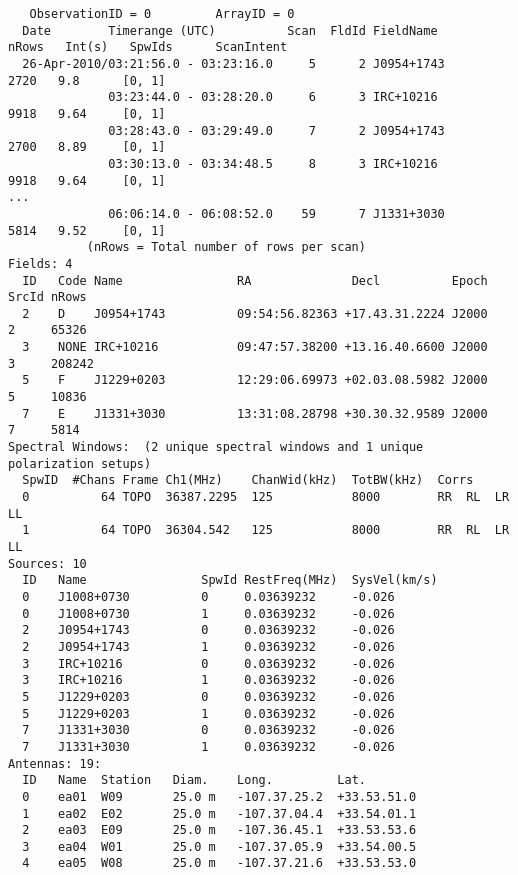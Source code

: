 \begin{verbatim}
   ObservationID = 0         ArrayID = 0
  Date        Timerange (UTC)          Scan  FldId FieldName           nRows   Int(s)   SpwIds      ScanIntent
  26-Apr-2010/03:21:56.0 - 03:23:16.0     5      2 J0954+1743          2720   9.8      [0, 1]                      
              03:23:44.0 - 03:28:20.0     6      3 IRC+10216           9918   9.64     [0, 1]                      
              03:28:43.0 - 03:29:49.0     7      2 J0954+1743          2700   8.89     [0, 1]                      
              03:30:13.0 - 03:34:48.5     8      3 IRC+10216           9918   9.64     [0, 1]                      
...           
              06:06:14.0 - 06:08:52.0    59      7 J1331+3030          5814   9.52     [0, 1]                      
           (nRows = Total number of rows per scan) 
Fields: 4
  ID   Code Name                RA              Decl          Epoch   SrcId nRows  
  2    D    J0954+1743          09:54:56.82363 +17.43.31.2224 J2000   2     65326  
  3    NONE IRC+10216           09:47:57.38200 +13.16.40.6600 J2000   3     208242 
  5    F    J1229+0203          12:29:06.69973 +02.03.08.5982 J2000   5     10836  
  7    E    J1331+3030          13:31:08.28798 +30.30.32.9589 J2000   7     5814   
Spectral Windows:  (2 unique spectral windows and 1 unique polarization setups)
  SpwID  #Chans Frame Ch1(MHz)    ChanWid(kHz)  TotBW(kHz)  Corrs          
  0          64 TOPO  36387.2295  125           8000        RR  RL  LR  LL  
  1          64 TOPO  36304.542   125           8000        RR  RL  LR  LL  
Sources: 10
  ID   Name                SpwId RestFreq(MHz)  SysVel(km/s) 
  0    J1008+0730          0     0.03639232     -0.026       
  0    J1008+0730          1     0.03639232     -0.026       
  2    J0954+1743          0     0.03639232     -0.026       
  2    J0954+1743          1     0.03639232     -0.026       
  3    IRC+10216           0     0.03639232     -0.026       
  3    IRC+10216           1     0.03639232     -0.026       
  5    J1229+0203          0     0.03639232     -0.026       
  5    J1229+0203          1     0.03639232     -0.026       
  7    J1331+3030          0     0.03639232     -0.026       
  7    J1331+3030          1     0.03639232     -0.026       
Antennas: 19:
  ID   Name  Station   Diam.    Long.         Lat.         
  0    ea01  W09       25.0 m   -107.37.25.2  +33.53.51.0  
  1    ea02  E02       25.0 m   -107.37.04.4  +33.54.01.1  
  2    ea03  E09       25.0 m   -107.36.45.1  +33.53.53.6  
  3    ea04  W01       25.0 m   -107.37.05.9  +33.54.00.5  
  4    ea05  W08       25.0 m   -107.37.21.6  +33.53.53.0  

\end{verbatim}
